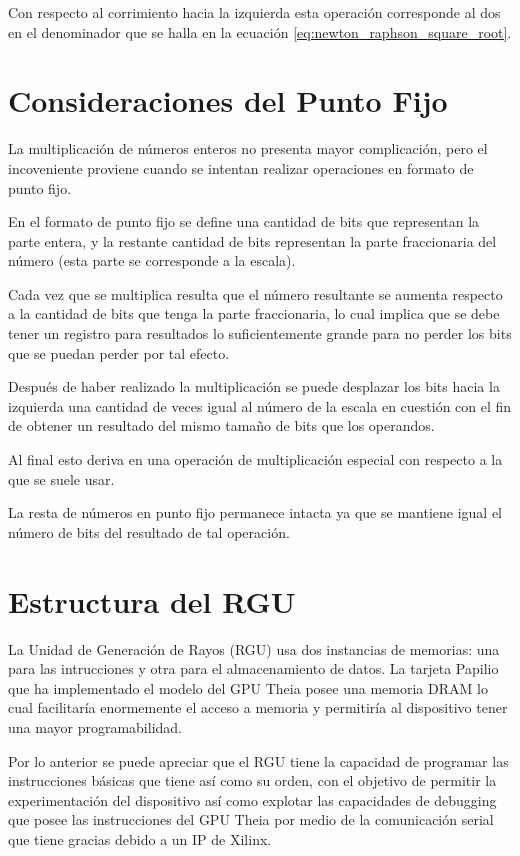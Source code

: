 Con respecto al corrimiento hacia la izquierda esta operación corresponde al dos en el denominador que se halla en la ecuación \eqref{eq:newton_raphson_square_root}.


\section{Consideraciones del Punto Fijo}

La multiplicación de números enteros no presenta mayor complicación, pero el incoveniente proviene cuando se intentan realizar operaciones en formato de punto fijo.

En el formato de punto fijo se define una cantidad de bits que representan la parte entera, y la restante cantidad de bits representan la parte fraccionaria del número (esta parte se corresponde a la escala).

Cada vez que se multiplica resulta que el número resultante se aumenta respecto a la cantidad de bits que tenga la parte fraccionaria, lo cual implica que se debe tener un registro para resultados lo suficientemente grande para no perder los bits que se puedan perder por tal efecto.

Después de haber realizado la multiplicación se puede desplazar los bits hacia la izquierda una cantidad de veces igual al número de la escala en cuestión con el fin de obtener un resultado del mismo tamaño de bits que los operandos.

Al final esto deriva en una operación de multiplicación especial con respecto a la que se suele usar.

La resta de números en punto fijo permanece intacta ya que se mantiene igual el número de bits del resultado de tal operación.

\section{Estructura del RGU}

La Unidad de Generación de Rayos (RGU) usa dos instancias de memorias: una para las intrucciones y otra para el almacenamiento de datos. La tarjeta Papilio que ha implementado el modelo del GPU Theia posee una memoria DRAM lo cual facilitaría enormemente el acceso a memoria y permitiría al dispositivo tener una mayor programabilidad.

Por lo anterior se puede apreciar que el RGU tiene la capacidad de programar las instrucciones básicas que tiene así como su orden, con el objetivo de permitir la experimentación del dispositivo así como explotar las capacidades de debugging que posee las instrucciones del GPU Theia por medio de la comunicación serial que tiene gracias debido a un IP de Xilinx.

